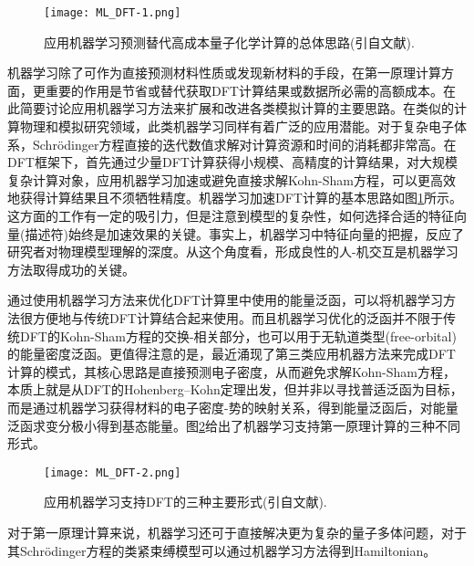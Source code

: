 \documentclass[10pt, oneside, a4paper]{article}      %
\newcommand{\upcite}[1]{\hspace{0ex}\textsuperscript{\cite{#1}}} %
\begin{document}
\begin{figure}[h!]
\centering
\vspace*{-0.1in}
\texttt{[image: ML\_DFT-1.png]}
\caption{\textrm{应用机器学习预测替代高成本量子化学计算的总体思路(引自文献\cite{ML-in-MS_2016}).}}%
\label{ML_QM}
\end{figure}
机器学习除了可作为直接预测材料性质或发现新材料的手段，在第一原理计算方面，更重要的作用是节省或替代获取\textrm{DFT}计算结果或数据所必需的高额成本。在此简要讨论应用机器学习方法来扩展和改进各类模拟计算的主要思路。在类似的计算物理和模拟研究领域，此类机器学习同样有着广泛的应用潜能。对于复杂电子体系，\textrm{Schr\"odinger}方程直接的迭代数值求解对计算资源和时间的消耗都非常高。在\textrm{DFT}框架下，首先通过少量\textrm{DFT}计算获得小规模、高精度的计算结果，对大规模复杂计算对象，应用机器学习加速或避免直接求解\textrm{Kohn-Sham}方程，可以更高效地获得计算结果且不须牺牲精度。机器学习加速\textrm{DFT}计算的基本思路如图\ref{ML_QM}所示。这方面的工作有一定的吸引力，但是注意到模型的复杂性，如何选择合适的特征向量(描述符)始终是加速效果的关键。事实上，机器学习中特征向量的把握，反应了研究者对物理模型理解的深度。从这个角度看，形成良性的人-机交互是机器学习方法取得成功的关键。

通过使用机器学习方法来优化\textrm{DFT}计算里中使用的能量泛函，可以将机器学习方法很方便地与传统\textrm{DFT}计算结合起来使用\upcite{PRB94-245129_2016,PRL108-253002_2012,JCP139-224104_2013,IJQC116-819_2016,JCP148-241705_2018}。而且机器学习优化的泛函并不限于传统\textrm{DFT}的\textrm{Kohn-Sham}方程的交换-相关部分，也可以用于无轨道类型\textrm{(free-orbital)}的能量密度泛函。更值得注意的是，最近涌现了第三类应用机器方法来完成\textrm{DFT}计算的模式，其核心思路是直接预测电子密度\upcite{NC8-872_2017,CMS149-250_2018,arXiv1811006255_2018}，从而避免求解\textrm{Kohn-Sham}方程，本质上就是从\textrm{DFT}的\textrm{Hohenberg–Kohn}定理出发，但并非以寻找普适泛函为目标，而是通过机器学习获得材料的电子密度-势的映射关系，得到能量泛函后，对能量泛函求变分极小得到基态能量。图\ref{ML_DFT}给出了机器学习支持第一原理计算的三种不同形式。
\begin{figure}[h!]
\centering
\vspace*{-0.1in}
\texttt{[image: ML\_DFT-2.png]}
\caption{应用机器学习支持\textrm{DFT}的三种主要形式(引自文献\cite{NC8-872_2017}).}%
\label{ML_DFT}
\end{figure}

对于第一原理计算来说，机器学习还可于直接解决更为复杂的量子多体问题\upcite{CPC104-1_1997,Science355-602_2017,PRE98-033305_2018}，对于其\textrm{Schr\"odinger}方程\upcite{PRA96-042113_2017}的类紧束缚模型可以通过机器学习方法得到\textrm{Hamiltonian}\upcite{SR7-42669_2017}。
\end{document}
